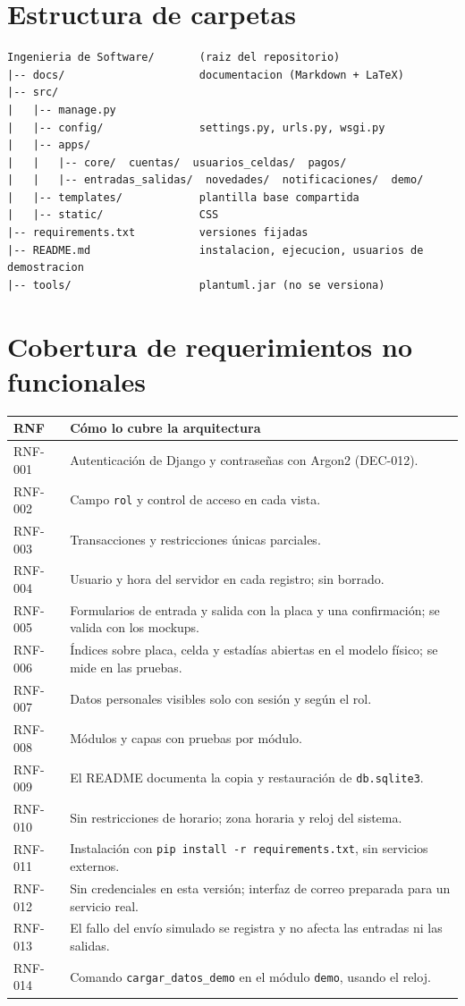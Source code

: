 \section{Estructura de carpetas}
\begin{lstlisting}[basicstyle=\ttfamily\footnotesize,columns=fullflexible,keepspaces=true,frame=single,rulecolor=\color{black!20}]
Ingenieria de Software/       (raiz del repositorio)
|-- docs/                     documentacion (Markdown + LaTeX)
|-- src/
|   |-- manage.py
|   |-- config/               settings.py, urls.py, wsgi.py
|   |-- apps/
|   |   |-- core/  cuentas/  usuarios_celdas/  pagos/
|   |   |-- entradas_salidas/  novedades/  notificaciones/  demo/
|   |-- templates/            plantilla base compartida
|   |-- static/               CSS
|-- requirements.txt          versiones fijadas
|-- README.md                 instalacion, ejecucion, usuarios de demostracion
|-- tools/                    plantuml.jar (no se versiona)
\end{lstlisting}

\section{Cobertura de requerimientos no funcionales}
\begin{longtable}{>{\raggedright\arraybackslash}p{2cm}>{\raggedright\arraybackslash}p{12.4cm}}
\toprule
\textbf{RNF} & \textbf{Cómo lo cubre la arquitectura}\\
\midrule\endhead
RNF-001 & Autenticación de Django y contraseñas con Argon2 (DEC-012).\\
RNF-002 & Campo \texttt{rol} y control de acceso en cada vista.\\
RNF-003 & Transacciones y restricciones únicas parciales.\\
RNF-004 & Usuario y hora del servidor en cada registro; sin borrado.\\
RNF-005 & Formularios de entrada y salida con la placa y una confirmación; se valida con los mockups.\\
RNF-006 & Índices sobre placa, celda y estadías abiertas en el modelo físico; se mide en las pruebas.\\
RNF-007 & Datos personales visibles solo con sesión y según el rol.\\
RNF-008 & Módulos y capas con pruebas por módulo.\\
RNF-009 & El README documenta la copia y restauración de \texttt{db.sqlite3}.\\
RNF-010 & Sin restricciones de horario; zona horaria y reloj del sistema.\\
RNF-011 & Instalación con \texttt{pip install -r requirements.txt}, sin servicios externos.\\
RNF-012 & Sin credenciales en esta versión; interfaz de correo preparada para un servicio real.\\
RNF-013 & El fallo del envío simulado se registra y no afecta las entradas ni las salidas.\\
RNF-014 & Comando \texttt{cargar\_datos\_demo} en el módulo \texttt{demo}, usando el reloj.\\
\bottomrule
\end{longtable}
